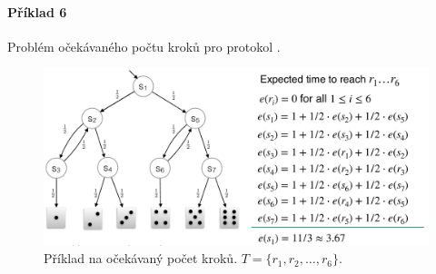 \paragraph*{Příklad 6} Problém očekávaného počtu kroků pro protokol .

\begin{figure}[H]
    \centering
    \includegraphics[width=1\linewidth]{priklad_5.pdf}
    \caption{Příklad na očekávaný počet kroků. $T = \{ r_1, r_2, \ldots, r_6 \}$.}
\end{figure}
